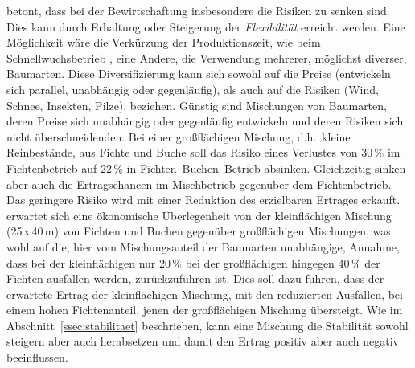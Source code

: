 \documentclass[twocolumn]{scrartcl}
\begin{document}
\cite{knoke2007mischwald} betont, dass bei der Bewirtschaftung
insbesondere die Risiken zu senken sind. Dies kann durch Erhaltung
oder Steigerung der \emph{Flexibilität} erreicht werden. Eine
Möglichkeit wäre die Verkürzung der Produktionszeit, wie beim
Schnellwuchsbetrieb
\citep{bohdanecky1890worlik,schiffel1904Wuchsgestze,schwappach1905durchforstungFichte,eulefeld1922schnellwuchs,gehrhardt1924StammzahlhaltungInJungenFichtenbestaenden},
eine Andere, die Verwendung mehrerer, möglichst diverser,
Baumarten. Diese Diversifizierung kann sich sowohl auf die Preise
(entwickeln sich parallel, unabhängig oder gegenläufig), als auch auf
die Risiken (Wind, Schnee, Insekten, Pilze), beziehen. Günstig sind
Mischungen von Baumarten, deren Preise sich unabhängig oder
gegenläufig entwickeln und deren Risiken sich nicht überschneidenden. Bei
einer großflächigen Mischung, d.h.\ kleine Reinbestände, aus Fichte
und Buche soll das Risiko eines Verlustes von 30\,\% im Fichtenbetrieb
auf 22\,\% in Fichten--Buchen--Betrieb absinken. Gleichzeitig sinken
aber auch die Ertragschancen im Mischbetrieb gegenüber dem
Fichtenbetrieb. Das geringere Risiko wird mit einer Reduktion des
erzielbaren Ertrages erkauft. \cite{knoke2007mischwaldB} erwartet sich
eine ökonomische Überlegenheit von der kleinflächigen Mischung
(25\,x\,40\,m) von Fichten und Buchen gegenüber großflächigen
Mischungen, was wohl auf die, hier vom Mischungsanteil der Baumarten
unabhängige, Annahme, dass bei der kleinflächigen nur 20\,\% bei der
großflächigen hingegen 40\,\% der Fichten ausfallen werden,
zurückzuführen ist. Dies soll dazu führen, dass der erwartete Ertrag
der kleinflächigen Mischung, mit den reduzierten Ausfällen, bei einem
hohen Fichtenanteil, jenen der großflächigen Mischung übersteigt. Wie
im Abschnitt~\ref{ssec:stabilitaet} beschrieben, kann eine Mischung
die Stabilität sowohl steigern aber auch herabsetzen und damit den
Ertrag positiv aber auch negativ beeinflussen.
\end{document}
